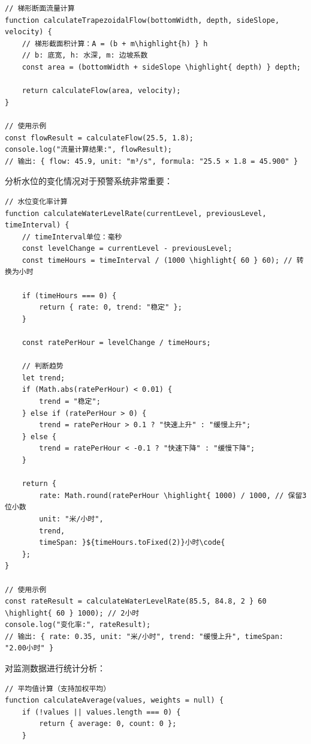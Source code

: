 {\begin{lstlisting}[style=javascript]
// 梯形断面流量计算
function calculateTrapezoidalFlow(bottomWidth, depth, sideSlope, velocity) {
    // 梯形截面积计算：A = (b + m\highlight{h) } h
    // b: 底宽, h: 水深, m: 边坡系数
    const area = (bottomWidth + sideSlope \highlight{ depth) } depth;
    
    return calculateFlow(area, velocity);
}

// 使用示例
const flowResult = calculateFlow(25.5, 1.8);
console.log("流量计算结果:", flowResult);
// 输出: { flow: 45.9, unit: "m³/s", formula: "25.5 × 1.8 = 45.900" }
\end{lstlisting}


分析水位的变化情况对于预警系统非常重要：

\begin{lstlisting}[style=javascript]
// 水位变化率计算
function calculateWaterLevelRate(currentLevel, previousLevel, timeInterval) {
    // timeInterval单位：毫秒
    const levelChange = currentLevel - previousLevel;
    const timeHours = timeInterval / (1000 \highlight{ 60 } 60); // 转换为小时
    
    if (timeHours === 0) {
        return { rate: 0, trend: "稳定" };
    }
    
    const ratePerHour = levelChange / timeHours;
    
    // 判断趋势
    let trend;
    if (Math.abs(ratePerHour) < 0.01) {
        trend = "稳定";
    } else if (ratePerHour > 0) {
        trend = ratePerHour > 0.1 ? "快速上升" : "缓慢上升";
    } else {
        trend = ratePerHour < -0.1 ? "快速下降" : "缓慢下降";
    }
    
    return {
        rate: Math.round(ratePerHour \highlight{ 1000) / 1000, // 保留3位小数
        unit: "米/小时",
        trend,
        timeSpan: }${timeHours.toFixed(2)}小时\code{
    };
}

// 使用示例
const rateResult = calculateWaterLevelRate(85.5, 84.8, 2 } 60 \highlight{ 60 } 1000); // 2小时
console.log("变化率:", rateResult);
// 输出: { rate: 0.35, unit: "米/小时", trend: "缓慢上升", timeSpan: "2.00小时" }
\end{lstlisting}


对监测数据进行统计分析：

\begin{lstlisting}[style=javascript]
// 平均值计算（支持加权平均）
function calculateAverage(values, weights = null) {
    if (!values || values.length === 0) {
        return { average: 0, count: 0 };
    }
    

\end{lstlisting}}
